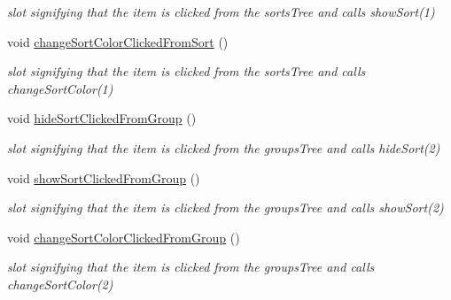 \begin{DoxyCompactItemize}
\begin{DoxyCompactList}\small\item\em slot signifying that the item is clicked from the sorts\-Tree and calls show\-Sort(1) \end{DoxyCompactList}\item 
\hypertarget{class_tree_area_a961bd8aaf9272cc4c669b624d2e1fd96}{void \hyperlink{class_tree_area_a961bd8aaf9272cc4c669b624d2e1fd96}{change\-Sort\-Color\-Clicked\-From\-Sort} ()}\label{class_tree_area_a961bd8aaf9272cc4c669b624d2e1fd96}

\begin{DoxyCompactList}\small\item\em slot signifying that the item is clicked from the sorts\-Tree and calls change\-Sort\-Color(1) \end{DoxyCompactList}\item 
\hypertarget{class_tree_area_ab5c0a22f1ccceb2244cb31f320971938}{void \hyperlink{class_tree_area_ab5c0a22f1ccceb2244cb31f320971938}{hide\-Sort\-Clicked\-From\-Group} ()}\label{class_tree_area_ab5c0a22f1ccceb2244cb31f320971938}

\begin{DoxyCompactList}\small\item\em slot signifying that the item is clicked from the groups\-Tree and calls hide\-Sort(2) \end{DoxyCompactList}\item 
\hypertarget{class_tree_area_ada5feadb41bb5cb913e253433e935107}{void \hyperlink{class_tree_area_ada5feadb41bb5cb913e253433e935107}{show\-Sort\-Clicked\-From\-Group} ()}\label{class_tree_area_ada5feadb41bb5cb913e253433e935107}

\begin{DoxyCompactList}\small\item\em slot signifying that the item is clicked from the groups\-Tree and calls show\-Sort(2) \end{DoxyCompactList}\item 
\hypertarget{class_tree_area_a393f334d7da481b4233ceb9912791c99}{void \hyperlink{class_tree_area_a393f334d7da481b4233ceb9912791c99}{change\-Sort\-Color\-Clicked\-From\-Group} ()}\label{class_tree_area_a393f334d7da481b4233ceb9912791c99}

\begin{DoxyCompactList}\small\item\em slot signifying that the item is clicked from the groups\-Tree and calls change\-Sort\-Color(2) \end{DoxyCompactList}\end{DoxyCompactItemize}

